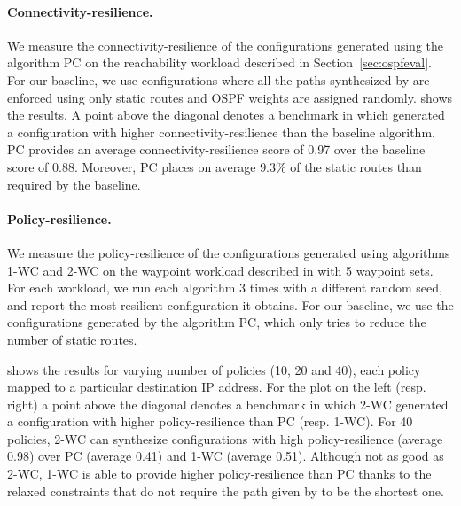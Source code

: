 \paragraph{Connectivity-resilience.}
We measure the connectivity-resilience of the configurations 
generated using the algorithm PC on the reachability 
workload described in
Section~\ref{sec:ospfeval}. 
For our baseline, we use configurations 
where all the paths synthesized by \genesis
are enforced using only static routes and
OSPF weights are assigned randomly.
shows the results. A point above the diagonal 
denotes a benchmark in which \name
generated a configuration with higher connectivity-resilience than
the baseline algorithm.
PC provides an average connectivity-resilience score 
of 0.97 over the baseline score 
of 0.88.
Moreover, PC places on average 
$9.3$\% of the static routes 
than required by the baseline. 



\paragraph{Policy-resilience.}
We measure the policy-resilience of the configurations 
generated using algorithms  1-WC and 2-WC on the waypoint workload described in
 with 5 waypoint sets. 
For each workload, we run each algorithm 
3 times with a different random seed, and report the most-resilient configuration it obtains.
For our baseline, we use the configurations generated by the algorithm PC, which
only tries to reduce the number of static routes.

shows the results
for varying number of policies (10, 20 and 40), each policy mapped 
to a particular destination IP address. 
For the plot on the left (resp. right)
a point above the diagonal 
denotes a benchmark in which 2-WC
generated a configuration with higher policy-resilience than
PC (resp. 1-WC).
For 40 policies, 
2-WC can synthesize 
configurations with high policy-resilience
(average 0.98) over PC (average 0.41) and 1-WC (average 0.51). 
Although not as good as 2-WC, 1-WC is able to provide 
higher policy-resilience than
PC thanks to the relaxed constraints that do not require
the path given by \genesis to be the shortest one.

